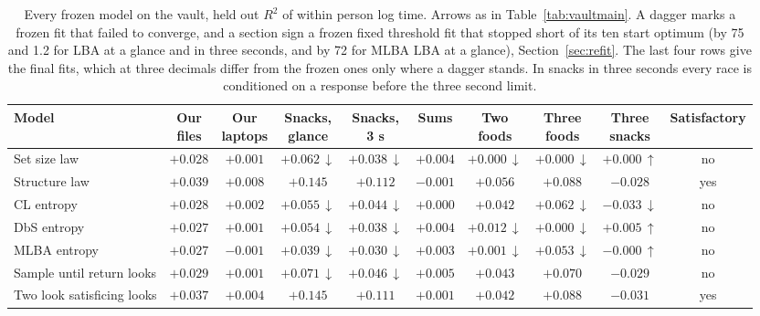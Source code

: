 \begin{table}[p]
\centering
\scriptsize
\setlength{\tabcolsep}{2.6pt}
\caption{Every frozen model on the vault, held out $R^2$ of within person log time. Arrows as in Table~\ref{tab:vaultmain}. A dagger marks a frozen fit that failed to converge, and a section sign a frozen fixed threshold fit that stopped short of its ten start optimum (by 75 and 1.2 for LBA at a glance and in three seconds, and by 72 for MLBA LBA at a glance), Section~\ref{sec:refit}. The last four rows give the final fits, which at three decimals differ from the frozen ones only where a dagger stands. In snacks in three seconds every race is conditioned on a response before the three second limit.}
\label{tab:vaultall}
\begin{tabular}{>{\raggedright\arraybackslash}p{3.9cm}ccccccccc}
\toprule
Model & \makecell{Our\\files} & \makecell{Our\\laptops} & \makecell{Snacks,\\glance} & \makecell{Snacks,\\3 s} & Sums & \makecell{Two\\foods} & \makecell{Three\\foods} & \makecell{Three\\snacks} & Satisfactory \\
\midrule
Set size law & $+0.028$ & $+0.001$ & $+0.062$\,$\downarrow$ & $+0.038$\,$\downarrow$ & $+0.004$ & $+0.000$\,$\downarrow$ & $+0.000$\,$\downarrow$ & $+0.000$\,$\uparrow$ & no \\
Structure law & $+0.039$ & $+0.008$ & $+0.145$ & $+0.112$ & $-0.001$ & $+0.056$ & $+0.088$ & $-0.028$ & yes \\
CL entropy & $+0.028$ & $+0.002$ & $+0.055$\,$\downarrow$ & $+0.044$\,$\downarrow$ & $+0.000$ & $+0.042$ & $+0.062$\,$\downarrow$ & $-0.033$\,$\downarrow$ & no \\
DbS entropy & $+0.027$ & $+0.001$ & $+0.054$\,$\downarrow$ & $+0.038$\,$\downarrow$ & $+0.004$ & $+0.012$\,$\downarrow$ & $+0.000$\,$\downarrow$ & $+0.005$\,$\uparrow$ & no \\
MLBA entropy & $+0.027$ & $-0.001$ & $+0.039$\,$\downarrow$ & $+0.030$\,$\downarrow$ & $+0.003$ & $+0.001$\,$\downarrow$ & $+0.053$\,$\downarrow$ & $-0.000$\,$\uparrow$ & no \\
Sample until return looks & $+0.029$ & $+0.001$ & $+0.071$\,$\downarrow$ & $+0.046$\,$\downarrow$ & $+0.005$ & $+0.043$ & $+0.070$ & $-0.029$ & no \\
Two look satisficing looks & $+0.037$ & $+0.004$ & $+0.145$ & $+0.111$ & $+0.001$ & $+0.042$ & $+0.088$ & $-0.031$ & yes \\

\end{tabular}
\end{table}
